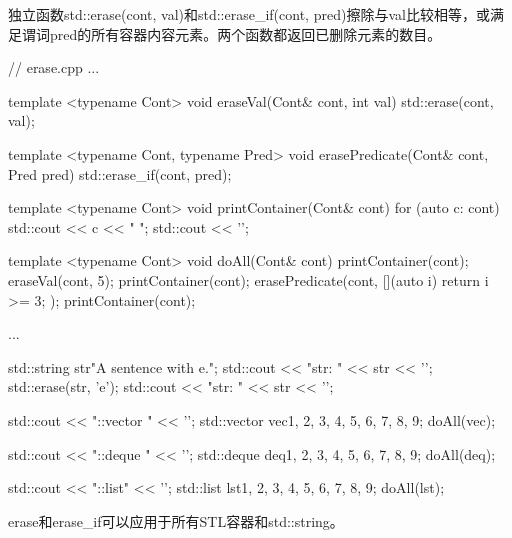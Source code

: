 独立函数std::erase(cont, val)和std::erase\_if(cont, pred)擦除与val比较相等，或满足谓词pred的所有容器内容元素。两个函数都返回已删除元素的数目。


\begin{cpp}
// erase.cpp
...

template <typename Cont>
void eraseVal(Cont& cont, int val) {
	std::erase(cont, val);
}

template <typename Cont, typename Pred>
void erasePredicate(Cont& cont, Pred pred) {
	std::erase_if(cont, pred);
}

template <typename Cont>
void printContainer(Cont& cont) {
	for (auto c: cont) std::cout << c << " ";
	std::cout << '\n';
}

template <typename Cont>
void doAll(Cont& cont) {
	printContainer(cont);
	eraseVal(cont, 5);
	printContainer(cont);
	erasePredicate(cont, [](auto i) { return i >= 3; } );
	printContainer(cont);
}

...

std::string str{"A sentence with e."};
std::cout << "str: " << str << '\n';
std::erase(str, 'e');
std::cout << "str: " << str << '\n';

std::cout << "\nstd::vector " << '\n';
std::vector vec{1, 2, 3, 4, 5, 6, 7, 8, 9};
doAll(vec);

std::cout << "\nstd::deque " << '\n';
std::deque deq{1, 2, 3, 4, 5, 6, 7, 8, 9};
doAll(deq);

std::cout << "\nstd::list" << '\n';
std::list lst{1, 2, 3, 4, 5, 6, 7, 8, 9};
doAll(lst);
\end{cpp}

erase和erase\_if可以应用于所有STL容器和std::string。


